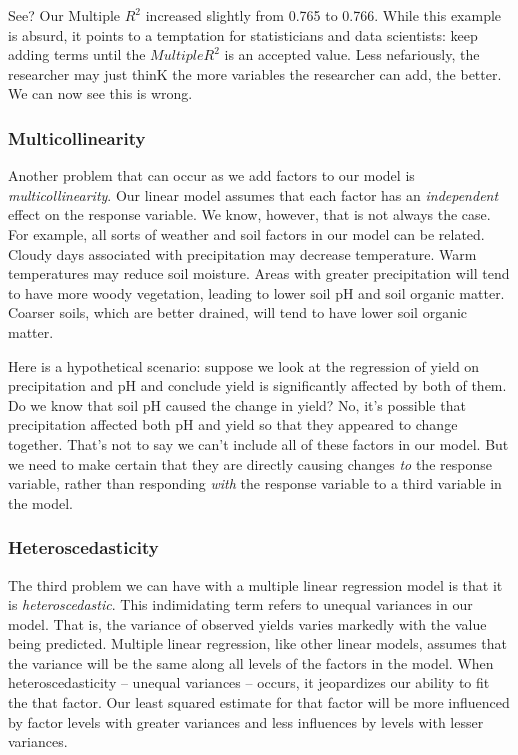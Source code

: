 \documentclass[
]{book}
\begin{document}
See? Our Multiple \(R^2\) increased slightly from 0.765 to 0.766. While this example is absurd, it points to a temptation for statisticians and data scientists: keep adding terms until the \(Multiple R^2\) is an accepted value. Less nefariously, the researcher may just thinK the more variables the researcher can add, the better. We can now see this is wrong.

\hypertarget{multicollinearity}{%
\subsubsection{Multicollinearity}\label{multicollinearity}}

Another problem that can occur as we add factors to our model is \emph{multicollinearity}. Our linear model assumes that each factor has an \emph{independent} effect on the response variable. We know, however, that is not always the case. For example, all sorts of weather and soil factors in our model can be related. Cloudy days associated with precipitation may decrease temperature. Warm temperatures may reduce soil moisture. Areas with greater precipitation will tend to have more woody vegetation, leading to lower soil pH and soil organic matter. Coarser soils, which are better drained, will tend to have lower soil organic matter.

Here is a hypothetical scenario: suppose we look at the regression of yield on precipitation and pH and conclude yield is significantly affected by both of them. Do we know that soil pH caused the change in yield? No, it's possible that precipitation affected both pH and yield so that they appeared to change together. That's not to say we can't include all of these factors in our model. But we need to make certain that they are directly causing changes \emph{to} the response variable, rather than responding \emph{with} the response variable to a third variable in the model.

\hypertarget{heteroscedasticity}{%
\subsubsection{Heteroscedasticity}\label{heteroscedasticity}}

The third problem we can have with a multiple linear regression model is that it is \emph{heteroscedastic}. This indimidating term refers to unequal variances in our model. That is, the variance of observed yields varies markedly with the value being predicted. Multiple linear regression, like other linear models, assumes that the variance will be the same along all levels of the factors in the model. When heteroscedasticity -- unequal variances -- occurs, it jeopardizes our ability to fit the that factor. Our least squared estimate for that factor will be more influenced by factor levels with greater variances and less influences by levels with lesser variances.
\end{document}
